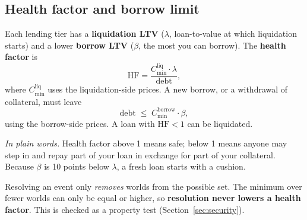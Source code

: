 \documentclass[11pt,a4paper]{article}
\newcommand{\inwords}[1]{\par\noindent\colorbox{note}{\parbox{\dimexpr\linewidth-2\fboxsep}{\small\textit{In plain words.} #1}}\par}
\begin{document}
\subsection{Health factor and borrow limit}

Each lending tier has a \textbf{liquidation LTV} ($\lambda$, loan-to-value at which liquidation starts) and a lower
\textbf{borrow LTV} ($\beta$, the most you can borrow). The \textbf{health factor} is
\begin{equation}
  \mathrm{HF} = \frac{C_{\min}^{\text{liq}} \cdot \lambda}{\text{debt}},
  \label{eq:hf}
\end{equation}
where $C^{\text{liq}}_{\min}$ uses the liquidation-side prices. A new borrow, or a withdrawal of collateral, must
leave
\begin{equation}
  \text{debt} \;\le\; C_{\min}^{\text{borrow}} \cdot \beta ,
  \label{eq:borrowlimit}
\end{equation}
using the borrow-side prices. A loan with $\mathrm{HF} < 1$ can be liquidated.
\inwords{Health factor above 1 means safe; below 1 means anyone may step in and repay part of your loan in exchange
for part of your collateral. Because $\beta$ is 10 points below $\lambda$, a fresh loan starts with a cushion.}

Resolving an event only \emph{removes} worlds from the possible set. The minimum over fewer worlds can only be equal
or higher, so \textbf{resolution never lowers a health factor}. This is checked as a property test
(Section~\ref{sec:security}).
\end{document}
